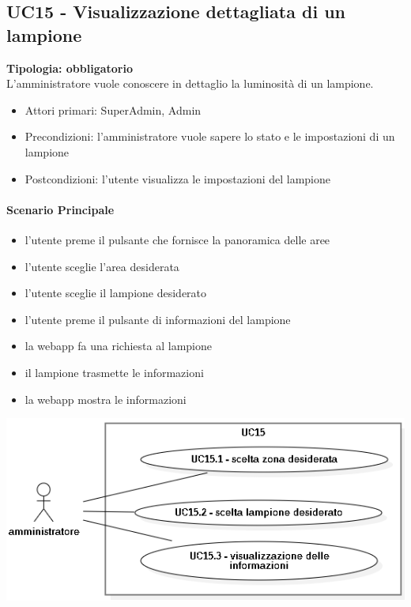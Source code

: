 \documentclass[12pt]{article}
\begin{document}
\subsection{UC15 - Visualizzazione dettagliata di un lampione}
\textbf{Tipologia: obbligatorio} \\
L'amministratore vuole conoscere in dettaglio la luminosità di un lampione.
\begin{itemize}
	\item Attori primari: SuperAdmin, Admin
	\item Precondizioni: l'amministratore vuole sapere lo stato e le impostazioni di un lampione
	\item Postcondizioni: l'utente visualizza le impostazioni del lampione
\end{itemize}
\paragraph{Scenario Principale}
\begin{itemize}
	\item l'utente preme il pulsante che fornisce la panoramica delle aree
	\item l'utente sceglie l'area desiderata
	\item l'utente sceglie il lampione desiderato
	\item l'utente preme il pulsante di informazioni del lampione
	\item la webapp fa una richiesta al lampione
	\item il lampione trasmette le informazioni
	\item la webapp mostra le informazioni
\end{itemize}

\includegraphics[scale=0.5]{UC15.png}
\end{document}
